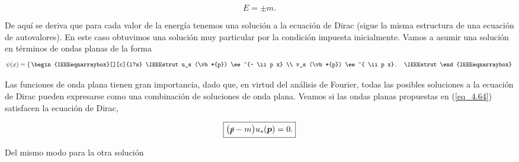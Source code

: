  \begin{equation}
 	\boxed{
 	E= \pm m.}
 \end{equation}

De aquí se deriva que para cada valor de la energía tenemos una solución a la ecuación de Dirac (sigue la misma estructura de una ecuación de autovalores). En este caso obtuvimos una solución muy particular por la condición impuesta inicialmente. Vamos a asumir una solución en términos de ondas planas de la forma  
\begin{equation}
	\psi(x) = \left\{ \,
	\begin{IEEEeqnarraybox}[][c]{l?s}
		\IEEEstrut
		u_s (\vb*{p}) \ee^{- \ii p x} \\
		v_s (\vb*{p}) \ee^{ \ii p x}.
		\IEEEstrut
	\end{IEEEeqnarraybox}
	\right.  
	\label{eq_4.64}
\end{equation}
 
 Las funciones de onda plana tienen gran importancia, dado que, en virtud del análisis de Fourier, todas las posibles soluciones a la ecuación de Dirac pueden expresarse como una combinación de soluciones de onda plana. Veamos si las ondas planas propuestas en (\ref{eq_4.64})  satisfacen la ecuación de Dirac,
 
\begin{equation}
	\boxed{\qty(  \slashed{p}  - m ) u_s (\vb*{p}) =  0.}
	 	\label{eq_4.65}
\end{equation}

Del mismo modo para la otra solución 



